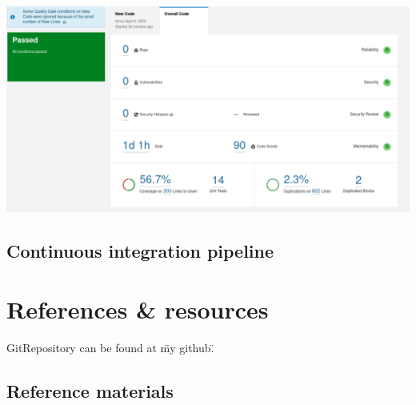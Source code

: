 \documentclass[12pt]{article}
\begin{document}
\includegraphics[scale=0.35]{sonarQube.png}

\subsection{Continuous integration pipeline}

\section{References \& resources}

GitRepository can be found at \"my github\".

\subsection{Reference materials}
\end{document}
